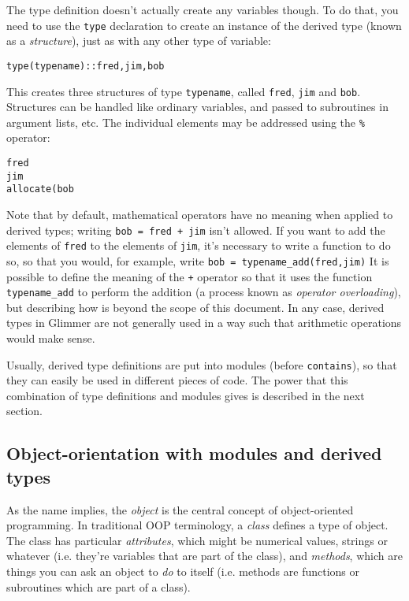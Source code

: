 The type definition doesn't actually create any variables though. To do that,
you need to use the \texttt{type} declaration to create an instance of the
derived type (known as a \emph{structure}), just as with any other type of
variable:
%
\begin{alltt}
    type(typename) :: fred, jim, bob
\end{alltt} 
%
This creates three structures of type \texttt{typename}, called \texttt{fred},
\texttt{jim} and \texttt{bob}. Structures can be handled like ordinary
variables, and passed to subroutines in argument lists, etc. The individual
elements may be addressed using the \texttt{\%} operator:
%
\begin{alltt}
    fred%realvar = 4.5
    jim%intvar = fred%intvar + 7
    allocate(bob%realarr(nx,ny))
\end{alltt}

Note that by default, mathematical operators have no meaning when applied to
derived types; writing \texttt{bob = fred + jim} isn't allowed. If you want to
add the elements of \texttt{fred} to the elements of \texttt{jim}, it's
necessary to write a function to do so, so that you would, for example, write
\texttt{bob = typename\_add(fred,jim)} It is possible to define the meaning of
the \texttt{+} operator so that it uses the function \texttt{typename\_add} to
perform the addition (a process known as \emph{operator overloading}), but
describing how is beyond the scope of this document. In any case, derived types
in Glimmer are not generally used in a way such that arithmetic operations
would make sense.

Usually, derived type definitions are put into modules (before
\texttt{contains}), so that they can easily be used in different pieces of
code. The power that this combination of type definitions and modules gives is
described in the next section.
%
\subsection{Object-orientation with modules and derived types}

As the name implies, the \emph{object} is the central concept of
object-oriented programming. In traditional OOP terminology, a \emph{class}
defines a type of object. The class has particular \emph{attributes}, which
might be numerical values, strings or whatever (i.e. they're variables that
are part of the class), and \emph{methods}, which are things you can ask an
object to \emph{do} to itself (i.e. methods are functions or subroutines which
are part of a class).

